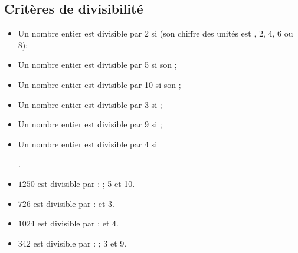 \documentclass[xcolor={dvipsnames}]{beamer}
\begin{document}
\subsection{Critères de divisibilité}

\begin{frame}
	\begin{myprops}
		
		
			\begin{itemize}
				\item Un nombre entier est divisible par 2 si \pause {} (son chiffre des unités est , 2, 4, 6 ou 8); \pause
				\item Un nombre entier est divisible par 5 si \pause son ; \pause
				\item Un nombre entier est divisible par 10 si \pause son ;	\pause
				
				\item Un nombre entier est divisible par 3 \pause si ; \pause
				\item Un nombre entier est divisible par 9 si \pause {}; \pause
				
				\item Un nombre entier est divisible par 4 si \pause {} 
				
				.
			\end{itemize}
		
	\end{myprops}
\end{frame}

\begin{frame}
	\begin{myexs}
		
			\begin{itemize}
				\item $1250$ est divisible par : ; 5 et 10. \pause 
				\item $726$ est divisible par :  et 3. \pause
				\item $1024$ est divisible par :  et 4.\pause
				\item $342$ est divisible par : ; 3 et 9.
				
			\end{itemize}
	
	\end{myexs}
\end{frame}
\end{document}
